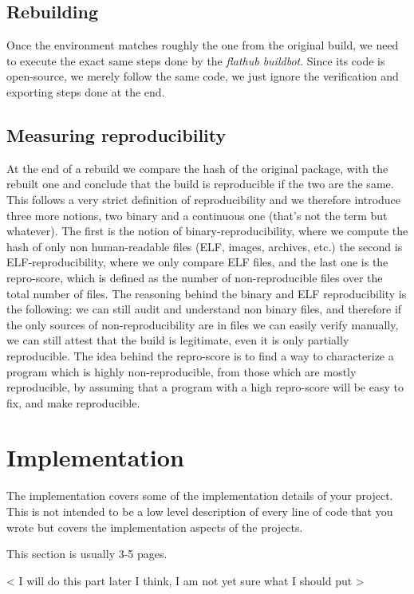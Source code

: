 \documentclass[a4paper,11pt,oneside]{report}
\theoremstyle{definition}
\newcommand{\fhbb}{\emph{flathub buildbot}\xspace}
\begin{document}
\section{Rebuilding}
Once the environment matches roughly the one from the original build, we need
to execute the exact same steps done by the \fhbb. Since its code is
open-source, we merely follow the same code, we just ignore the verification
and exporting steps done at the end.

\section{Measuring reproducibility}
At the end of a rebuild we compare the hash of the original package, with the
rebuilt one and conclude that the build is reproducible if the two are the
same. This follows a very strict definition of reproducibility and we therefore
introduce three more notions, two binary and a continuous one (that's not the
term but whatever). The first is the notion of binary-reproducibility, where we
compute the hash of only non human-readable files (ELF, images, archives, etc.)
the second is ELF-reproducibility, where we only compare ELF files, and the
last one is the repro-score, which is defined as the number of non-reproducible
files over the total number of files.
The reasoning behind the binary and ELF reproducibility is the following: we
can still audit and understand non binary files, and therefore if the only
sources of non-reproducibility are in files we can easily verify manually, we
can still attest that the build is legitimate, even it is only partially
reproducible.
The idea behind the repro-score is to find a way to characterize a program
which is highly non-reproducible, from those which are mostly reproducible, by
assuming that a program with a high repro-score will be easy to fix, and make
reproducible.


\chapter{Implementation}

The implementation covers some of the implementation details of your project.
This is not intended to be a low level description of every line of code that
you wrote but covers the implementation aspects of the projects.

This section is usually 3-5 pages.

< I will do this part later I think, I am not yet sure what I should put >
\end{document}
